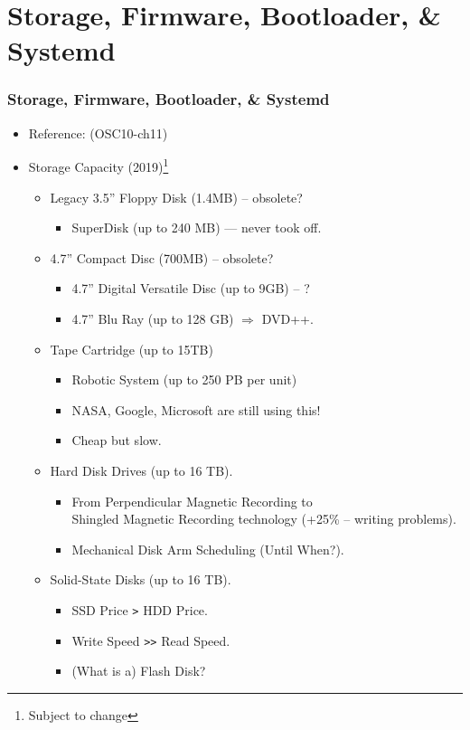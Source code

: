 \documentclass[xcolor=table, notheorems, hyperref={pdfpagelabels=false}]{beamer}
\begin{document}
\section{Storage, Firmware, Bootloader, \& Systemd}
\begin{frame}
\frametitle{Storage, Firmware, Bootloader, \& Systemd}
\begin{itemize}
\item Reference: (OSC10-ch11)
\item Storage Capacity (2019)\footnote{Subject to change}
\begin{itemize}
\item Legacy 3.5'' Floppy Disk (1.4MB) -- obsolete?
\begin{itemize}
\item SuperDisk (up to 240 MB) --- never took off.
\end{itemize}
\item 4.7'' Compact Disc (700MB) -- obsolete?
\begin{itemize}
\item 4.7'' Digital Versatile Disc (up to 9GB) -- ?
\item 4.7'' Blu Ray (up to 128 GB) $\Rightarrow$ DVD++.
\end{itemize}
\item Tape Cartridge (up to 15TB)
\begin{itemize}
\item Robotic System (up to 250 PB per unit)
\item NASA, Google, Microsoft are still using this!
\item Cheap but slow.
\end{itemize}
\item Hard Disk Drives (up to 16 TB).
\begin{itemize}
\item From Perpendicular Magnetic Recording to \\
      Shingled Magnetic Recording technology (+25\% -- writing problems).
\item Mechanical Disk Arm Scheduling (Until When?).
\end{itemize}
\item Solid-State Disks (up to 16 TB).
\begin{itemize}
\item SSD Price \texttt{>} HDD Price.
\item Write Speed \texttt{>{}>} Read Speed.
\item (What is a) Flash Disk?
\end{itemize}
\end{itemize}
\end{itemize}
\end{frame}
\end{document}
